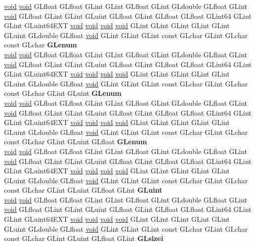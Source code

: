 \begin{DoxyCompactItemize}
\begin{tabbing}
\>\hyperlink{interfacevoid}{void} \hyperlink{interfacevoid}{void} GLfloat GLfloat GLint GLint GLfloat GLint GLdouble GLfloat GLint \hyperlink{interfacevoid}{void} GLfloat GLint GLint GLuint GLfloat GLint GLfloat GLfloat GLint64 GLint GLint GLuint64EXT \hyperlink{interfacevoid}{void} \hyperlink{interfacevoid}{void} \hyperlink{interfacevoid}{void} \hyperlink{interfacevoid}{void} GLint GLint GLint GLint GLint GLuint GLdouble GLfloat \hyperlink{interfacevoid}{void} GLint GLint GLint const GLchar GLint GLchar const GLchar {\bfseries GLenum}\\
\>\hyperlink{interfacevoid}{void} \hyperlink{interfacevoid}{void} GLfloat GLfloat GLint GLint GLfloat GLint GLdouble GLfloat GLint \hyperlink{interfacevoid}{void} GLfloat GLint GLint GLuint GLfloat GLint GLfloat GLfloat GLint64 GLint GLint GLuint64EXT \hyperlink{interfacevoid}{void} \hyperlink{interfacevoid}{void} \hyperlink{interfacevoid}{void} \hyperlink{interfacevoid}{void} GLint GLint GLint GLint GLint GLuint GLdouble GLfloat \hyperlink{interfacevoid}{void} GLint GLint GLint const GLchar GLint GLchar const GLchar GLint GLuint {\bfseries GLenum}\\
\>\hyperlink{interfacevoid}{void} \hyperlink{interfacevoid}{void} GLfloat GLfloat GLint GLint GLfloat GLint GLdouble GLfloat GLint \hyperlink{interfacevoid}{void} GLfloat GLint GLint GLuint GLfloat GLint GLfloat GLfloat GLint64 GLint GLint GLuint64EXT \hyperlink{interfacevoid}{void} \hyperlink{interfacevoid}{void} \hyperlink{interfacevoid}{void} \hyperlink{interfacevoid}{void} GLint GLint GLint GLint GLint GLuint GLdouble GLfloat \hyperlink{interfacevoid}{void} GLint GLint GLint const GLchar GLint GLchar const GLchar GLint GLuint GLfloat {\bfseries GLenum}\\
\>\hyperlink{interfacevoid}{void} \hyperlink{interfacevoid}{void} GLfloat GLfloat GLint GLint GLfloat GLint GLdouble GLfloat GLint \hyperlink{interfacevoid}{void} GLfloat GLint GLint GLuint GLfloat GLint GLfloat GLfloat GLint64 GLint GLint GLuint64EXT \hyperlink{interfacevoid}{void} \hyperlink{interfacevoid}{void} \hyperlink{interfacevoid}{void} \hyperlink{interfacevoid}{void} GLint GLint GLint GLint GLint GLuint GLdouble GLfloat \hyperlink{interfacevoid}{void} GLint GLint GLint const GLchar GLint GLchar const GLchar GLint GLuint GLfloat GLint {\bfseries GLuint}\\
\>\hyperlink{interfacevoid}{void} \hyperlink{interfacevoid}{void} GLfloat GLfloat GLint GLint GLfloat GLint GLdouble GLfloat GLint \hyperlink{interfacevoid}{void} GLfloat GLint GLint GLuint GLfloat GLint GLfloat GLfloat GLint64 GLint GLint GLuint64EXT \hyperlink{interfacevoid}{void} \hyperlink{interfacevoid}{void} \hyperlink{interfacevoid}{void} \hyperlink{interfacevoid}{void} GLint GLint GLint GLint GLint GLuint GLdouble GLfloat \hyperlink{interfacevoid}{void} GLint GLint GLint const GLchar GLint GLchar const GLchar GLint GLuint GLfloat GLint {\bfseries GLsizei}\\

\end{tabbing}
\end{DoxyCompactItemize}
